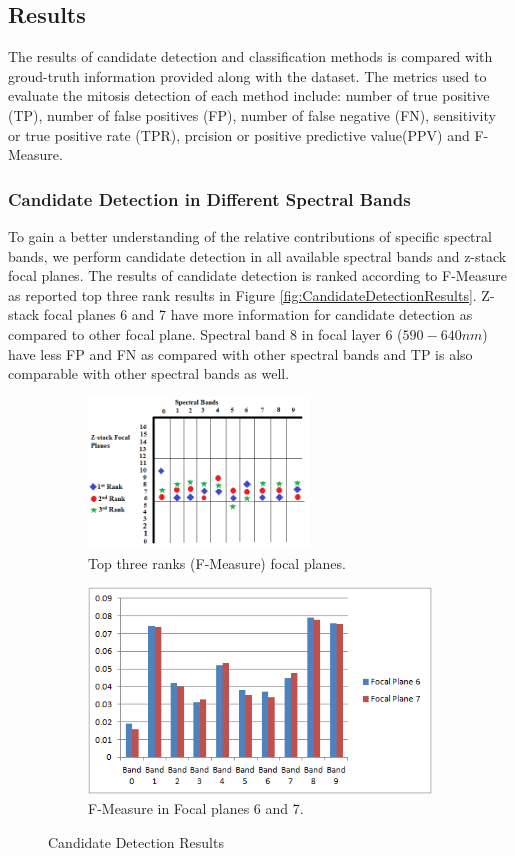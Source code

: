 \documentclass[10pt,twocolumn,letterpaper]{article}
\begin{document}
\subsection{Results}
The results of candidate detection and classification methods is compared with groud-truth information provided along with the dataset. The metrics used to evaluate the mitosis detection of each method include: number of true positive (TP), number of false positives (FP), number of false negative (FN), sensitivity or true positive rate (TPR), prcision or positive predictive value(PPV) and F-Measure.
\subsubsection{Candidate Detection in Different Spectral Bands}
To gain a better understanding of the relative contributions of specific spectral bands, we perform candidate detection in all available spectral bands and z-stack focal planes. The results of candidate detection is ranked according to F-Measure as reported top three rank results in Figure \ref{fig:CandidateDetectionResults}. Z-stack focal planes 6 and 7 have more information for candidate detection as compared to other focal plane. Spectral band 8 in focal layer 6 ($590-640 nm$) have less FP and FN as compared with other spectral bands and TP is also comparable with other spectral bands as well.

\begin{figure}
	\centering
	\label{fig:CandidateDetectionResults}
	\begin{subfigure}[b]{0.5\textwidth}
		\includegraphics[width=\textwidth,height=40mm]	{diagrams/SpectralFocalCanDet.png}
		\caption{Top three ranks (F-Measure) focal planes.}
	\end{subfigure}
	\begin{subfigure}[b]{0.5\textwidth}
		\includegraphics[width=\textwidth]{diagrams/BandFocalGraph.png}
		\caption{F-Measure in Focal planes 6 and 7.}
	\end{subfigure}
	\caption{Candidate Detection Results}
\end{figure}
\end{document}
